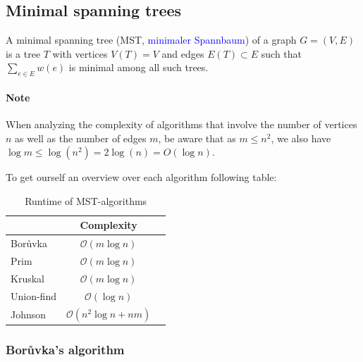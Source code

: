 \documentclass[a4paper]{article}
\begin{document}
\subsection{Minimal spanning trees}

A minimal spanning tree (MST, \textcolor{blue}{{minimaler Spannbaum}}) of a graph $G=\left(V,E\right)$ is a tree $T$ with vertices $V\left(T\right) = V$ and edges $E\left(T\right) \subset E$ such that $\sum_{e \in E} w\left(e\right)$ is minimal among all such trees. 

\paragraph{Note} When analyzing the complexity of algorithms that involve the number of vertices $n$ as well as the number of edges $m$, be aware that as $m \leq n^2$, we also have $\log m \leq \log\left(n^2\right) = 2\log\left(n\right) = O\left(\log n\right)$.

To get ourself an overview over each algorithm following table:
\begin{table}[h]
    \centering
    \begin{tabular}{| l| c | c |}
         \hline
            {}    &
        \textbf{Complexity} \\
        
         \hline
         Bor\r{u}vka &
         $\mathcal{O}(m\log n)$\\
         
         Prim &
         $\mathcal{O}(m\log n)$\\
         
         Kruskal &
         $\mathcal{O}(m\log n)$\\
         
         Union-find &
         $\mathcal{O}(\log n)$\\
         
         Johnson &
         $\mathcal{O}(n^2\log n + nm)$ \\
         
         \hline
    \end{tabular}
    \caption{Runtime of MST-algorithms}
    \label{tab:MST algorithm runtime}
\end{table}

\subsubsection{Bor\r{u}vka's algorithm}
\end{document}
